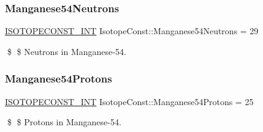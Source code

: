 \subsubsection{\texorpdfstring{Manganese54\+Neutrons}{Manganese54Neutrons}}
{\footnotesize\ttfamily \mbox{\hyperlink{group___isotope_const-_macros_ga5f18360b3e99483a35c32d789e62621c}{I\+S\+O\+T\+O\+P\+E\+C\+O\+N\+S\+T\+\_\+\+I\+NT}} Isotope\+Const\+::\+Manganese54\+Neutrons = 29}

\$ \$ Neutrons in Manganese-\/54. \mbox{\label{group___isotope_const-_manganese-_mn54_ga76a33c7a7aa77eb043b357b185fb3637}} 
\subsubsection{\texorpdfstring{Manganese54\+Protons}{Manganese54Protons}}
{\footnotesize\ttfamily \mbox{\hyperlink{group___isotope_const-_macros_ga5f18360b3e99483a35c32d789e62621c}{I\+S\+O\+T\+O\+P\+E\+C\+O\+N\+S\+T\+\_\+\+I\+NT}} Isotope\+Const\+::\+Manganese54\+Protons = 25}

\$ \$ Protons in Manganese-\/54. 